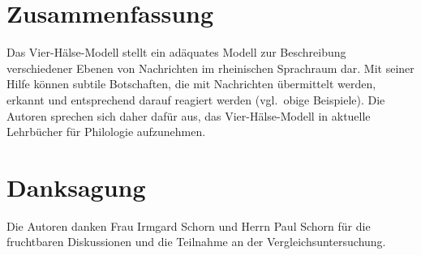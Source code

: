 \documentclass[11pt,DIV16,twocolumn]{scrartcl}
\begin{document}
\section{Zusammenfassung}

Das Vier-Hälse-Modell stellt ein adäquates Modell zur Beschreibung
verschiedener Ebenen von Nachrichten im rheinischen Sprachraum dar.
Mit seiner Hilfe können subtile Botschaften, die mit Nachrichten
übermittelt werden, erkannt und entsprechend darauf reagiert werden
(vgl.\ obige Beispiele).  Die Autoren sprechen sich daher dafür aus,
das Vier-Hälse-Modell in aktuelle Lehrbücher für Philologie
aufzunehmen.

\section*{Danksagung}

Die Autoren danken Frau Irmgard Schorn und Herrn Paul Schorn für die
fruchtbaren Diskussionen und die Teilnahme an der
Vergleichsuntersuchung.



\end{document}

